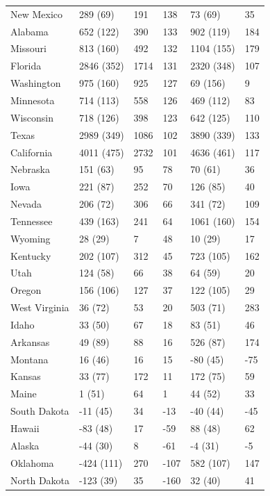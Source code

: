 \documentclass[11pt]{article}
\begin{document}
\begin{table}
\begin{tabular}{|l|lll|ll|}
  New Mexico & 289 (69) & 191 & 138 & 73 (69) & 35 \\ 
  Alabama & 652 (122) & 390 & 133 & 902 (119) & 184 \\ 
  Missouri & 813 (160) & 492 & 132 & 1104 (155) & 179 \\ 
  Florida & 2846 (352) & 1714 & 131 & 2320 (348) & 107 \\ 
  Washington & 975 (160) & 925 & 127 & 69 (156) & 9 \\ 
  Minnesota & 714 (113) & 558 & 126 & 469 (112) & 83 \\ 
  Wisconsin & 718 (126) & 398 & 123 & 642 (125) & 110 \\ 
  Texas & 2989 (349) & 1086 & 102 & 3890 (339) & 133 \\ 
  California & 4011 (475) & 2732 & 101 & 4636 (461) & 117 \\ 
  Nebraska & 151 (63) & 95 & 78 & 70 (61) & 36 \\ 
  Iowa & 221 (87) & 252 & 70 & 126 (85) & 40 \\ 
  Nevada & 206 (72) & 306 & 66 & 341 (72) & 109 \\ 
  Tennessee & 439 (163) & 241 & 64 & 1061 (160) & 154 \\ 
  Wyoming & 28 (29) & 7 & 48 & 10 (29) & 17 \\ 
  Kentucky & 202 (107) & 312 & 45 & 723 (105) & 162 \\ 
  Utah & 124 (58) & 66 & 38 & 64 (59) & 20 \\ 
  Oregon & 156 (106) & 127 & 37 & 122 (105) & 29 \\ 
  West Virginia & 36 (72) & 53 & 20 & 503 (71) & 283 \\ 
  Idaho & 33 (50) & 67 & 18 & 83 (51) & 46 \\ 
  Arkansas & 49 (89) & 88 & 16 & 526 (87) & 174 \\ 
  Montana & 16 (46) & 16 & 15 & -80 (45) & -75 \\ 
  Kansas & 33 (77) & 172 & 11 & 172 (75) & 59 \\ 
  Maine & 1 (51) & 64 & 1 & 44 (52) & 33 \\ 
  South Dakota & -11 (45) & 34 & -13 & -40 (44) & -45 \\ 
  Hawaii & -83 (48) & 17 & -59 & 88 (48) & 62 \\ 
  Alaska & -44 (30) & 8 & -61 & -4 (31) & -5 \\ 
  Oklahoma & -424 (111) & 270 & -107 & 582 (107) & 147 \\ 
  North Dakota & -123 (39) & 35 & -160 & 32 (40) & 41 \\ 

\end{tabular}
\end{table}
\end{document}
